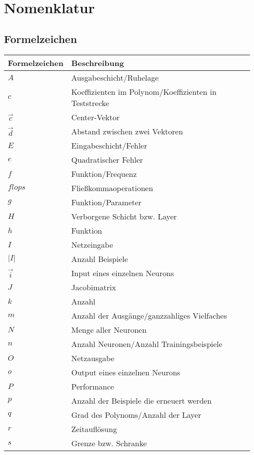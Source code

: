 \chapter{Nomenklatur}
    \section{Formelzeichen}
    \begin{longtable}[l]{p{3cm}|p{12cm}}
        Formelzeichen & Beschreibung\\
        \hline
        $A$ &Ausgabeschicht/Ruhelage\\
        $c$ & Koeffizienten im Polynom/Koeffizienten in Teststrecke \\
        $\vec{c}$ &Center-Vektor\\
        $\vec{d}$ & Abstand zwischen zwei Vektoren\\
        $E$ & Eingabeschicht/Fehler\\
        $e$ & Quadratischer Fehler\\
        $f$ & Funktion/Frequenz\\ 
        $flops$ & Fließkommaoperationen \\
        $g$ & Funktion/Parameter\\
        $H$ & Verborgene Schicht bzw. Layer\\
        $h$ & Funktion\\
        $I$ & Netzeingabe\\
        $|I|$ & Anzahl Beispiele\\
        $\vec{i}$ & Input eines einzelnen Neurons\\
        $J$ & Jacobimatrix\\
        $k$ & Anzahl \\
        $m$ & Anzahl der Ausgänge/ganzzahliges Vielfaches\\
        $N$ & Menge aller Neuronen\\
        $n$ & Anzahl Neuronen/Anzahl Trainingsbeispiele\\
        $O$ & Netzausgabe\\
        $o$ & Output eines einzelnen Neurons\\
        $P$ & Performance\\
        $p$ & Anzahl der Beispiele die erneuert werden\\
        $q$ & Grad des Polynoms/Anzahl der Layer\\
        $r$ & Zeitauflösung\\
        $s$ & Grenze bzw. Schranke\\

\end{longtable}
